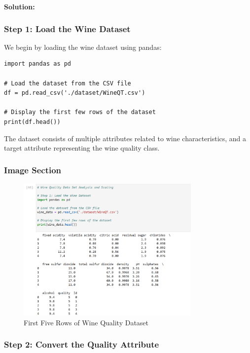 \documentclass{exam}
\begin{document}
\textbf{Solution:}

\subsubsection{Step 1: Load the Wine Dataset}

We begin by loading the wine dataset using pandas:

\begin{verbatim}
import pandas as pd

# Load the dataset from the CSV file
df = pd.read_csv('./dataset/WineQT.csv')

# Display the first few rows of the dataset
print(df.head())
\end{verbatim}

The dataset consists of multiple attributes related to wine characteristics, and a target attribute representing the wine quality class.

\subsubsection*{Image Section}

\begin{figure}[h!]
    \centering
    \includegraphics[width=0.8\textwidth]{images/wine_dataset_head.png}
    \caption{First Five Rows of Wine Quality Dataset}
    \label{fig:wine_dataset_head}
\end{figure}

\newpage

\subsubsection{Step 2: Convert the Quality Attribute}
\end{document}

